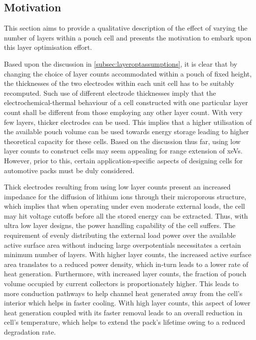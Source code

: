 \subsection{Motivation}\label{subsec:layeroptmotivation}

This section aims to provide a  qualitative description of the effect of varying
the number of layers  within a pouch cell and presents  the motivation to embark
upon this layer optimisation effort.

Based upon the  discussion in \cref{subsec:layeroptassumptions},  it is clear
that  by changing the choice of layer counts accommodated within  a pouch  of
fixed height, the thicknesses of the two electrodes within each unit cell has to
be suitably recomputed.   Such use of different electrode thicknesses imply that
the electrochemical-thermal behaviour  of a cell constructed with one particular
layer count shall be different from those employing any other layer count. With
very few layers, thicker electrodes can be used. This implies that a higher
utilisation of the available pouch volume can be used towards energy storage
leading to higher theoretical capacity for these cells. Based  on the 
discussion thus far,  using low layer counts to construct cells may seem
appealing for range extension of \glspl{xeV}. However, prior to this, certain
application-specific aspects of designing cells for automotive packs must be
duly considered.

Thick electrodes resulting from using low layer counts present an increased
impedance for the diffusion of lithium ions through their microporous structure,
which implies that when operating under even moderate external loads, the cell
may hit voltage cutoffs before all the stored energy can be extracted. Thus,
with ultra low layer designs, the power handling capability of the cell suffers.
The requirement of evenly distributing  the external load power  over the
available active surface area without inducing large overpotentials necessitates
a certain minimum number of layers.  With higher layer counts, the increased
active surface area translates to a reduced  power density, which in-turn leads
to a lower rate of heat generation. Furthermore, with increased layer counts,
the fraction of pouch volume occupied by current collectors is proportionately
higher. This leads to more conduction pathways to help channel heat generated
away from the cell's interior which helps in faster cooling. With high layer
counts, this aspect of lower heat generation coupled with its faster removal
leads to an overall reduction in cell's temperature, which helps to extend the
pack's lifetime owing to a reduced degradation rate.

